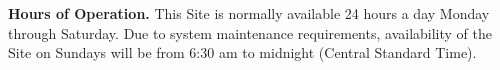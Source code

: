 \textbf{Hours of Operation.}
This Site is normally available 24 hours a day Monday through Saturday. Due to
system maintenance requirements, availability of the Site on Sundays will be
from 6:30 am to midnight (Central Standard Time).